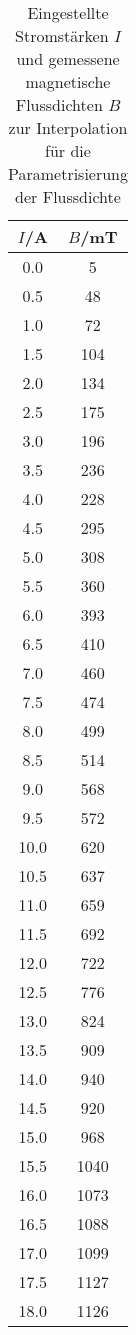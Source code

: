 \begin{table}[htp]
	\begin{center}
    \caption{Eingestellte Stromstärken $I$ und gemessene magnetische Flussdichten $B$ zur Interpolation für die Parametrisierung der Flussdichte}
    \label{tab:IB}
		\begin{tabular}{cc}
		\toprule
			{$I$/A} & {$B$/mT}\\
			\midrule
			 0.0 &    5\\
			 0.5 &   48\\
			 1.0 &   72\\
			 1.5 &  104\\
			 2.0 &  134\\
			 2.5 &  175\\
			 3.0 &  196\\
			 3.5 &  236\\
			 4.0 &  228\\
			 4.5 &  295\\
			 5.0 &  308\\
			 5.5 &  360\\
			 6.0 &  393\\
			 6.5 &  410\\
			 7.0 &  460\\
			 7.5 &  474\\
			 8.0 &  499\\
			 8.5 &  514\\
			 9.0 &  568\\
			 9.5 &  572\\
			10.0 &  620\\
			10.5 &  637\\
			11.0 &  659\\
			11.5 &  692\\
			12.0 &  722\\
			12.5 &  776\\
			13.0 &  824\\
			13.5 &  909\\
			14.0 &  940\\
			14.5 &  920\\
			15.0 &  968\\
			15.5 & 1040\\
			16.0 & 1073\\
			16.5 & 1088\\
			17.0 & 1099\\
			17.5 & 1127\\
			18.0 & 1126\\
		\bottomrule
		\end{tabular}
	\end{center}
\end{table}

